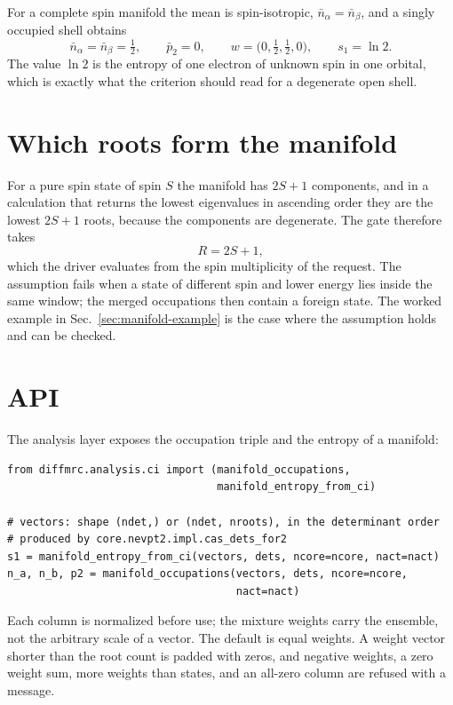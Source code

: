 For a complete spin manifold the mean is spin-isotropic,
$\bar{n}_{\alpha}=\bar{n}_{\beta}$, and a singly occupied shell
obtains
\begin{equation}
  \bar{n}_{\alpha}=\bar{n}_{\beta}=\tfrac12,\qquad \bar{p}_{2}=0,
  \qquad w=\bigl(0,\tfrac12,\tfrac12,0\bigr),
  \qquad s_{1}=\ln 2 .
  \label{eq:manifold-ln2}
\end{equation}
The value $\ln 2$ is the entropy of one electron of unknown spin in
one orbital, which is exactly what the criterion should read for a
degenerate open shell.

\section{Which roots form the manifold}

For a pure spin state of spin $S$ the manifold has $2S+1$ components,
and in a calculation that returns the lowest eigenvalues in ascending
order they are the lowest $2S+1$ roots, because the components are
degenerate.  The gate therefore takes
\begin{equation}
  R = 2S+1,
  \label{eq:nroots}
\end{equation}
which the driver evaluates from the spin multiplicity of the request.
The assumption fails when a state of different spin and lower energy
lies inside the same window; the merged occupations then contain a
foreign state.  The worked example in
Sec.~\ref{sec:manifold-example} is the case where the assumption
holds and can be checked.

\section{API}

The analysis layer exposes the occupation triple and the entropy of a
manifold:
\begin{lstlisting}
from diffmrc.analysis.ci import (manifold_occupations,
                                 manifold_entropy_from_ci)

# vectors: shape (ndet,) or (ndet, nroots), in the determinant order
# produced by core.nevpt2.impl.cas_dets_for2
s1 = manifold_entropy_from_ci(vectors, dets, ncore=ncore, nact=nact)
n_a, n_b, p2 = manifold_occupations(vectors, dets, ncore=ncore,
                                    nact=nact)
\end{lstlisting}
Each column is normalized before use; the mixture weights carry the
ensemble, not the arbitrary scale of a vector.  The default is equal
weights.  A weight vector shorter than the root count is padded with
zeros, and negative weights, a zero weight sum, more weights than
states, and an all-zero column are refused with a message.

